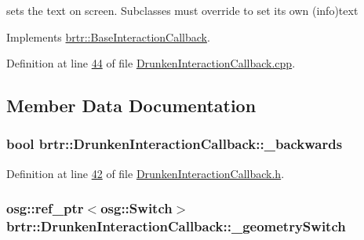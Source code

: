 sets the text on screen. Subclasses must override to set its own (info)text 



Implements \hyperlink{classbrtr_1_1_base_interaction_callback_a0fe57e329f044e21d49041c861435ad8}{brtr\+::\+Base\+Interaction\+Callback}.



Definition at line \hyperlink{_drunken_interaction_callback_8cpp_source_l00044}{44} of file \hyperlink{_drunken_interaction_callback_8cpp_source}{Drunken\+Interaction\+Callback.\+cpp}.



\subsection{Member Data Documentation}
\hypertarget{classbrtr_1_1_drunken_interaction_callback_a4be32ea919b41bd46acc34904fb5c7b7}{
\subsubsection[{\+\_\+backwards}]{\setlength{\rightskip}{0pt plus 5cm}bool brtr\+::\+Drunken\+Interaction\+Callback\+::\+\_\+backwards\hspace{0.3cm}{\ttfamily [private]}}}\label{classbrtr_1_1_drunken_interaction_callback_a4be32ea919b41bd46acc34904fb5c7b7}


Definition at line \hyperlink{_drunken_interaction_callback_8h_source_l00042}{42} of file \hyperlink{_drunken_interaction_callback_8h_source}{Drunken\+Interaction\+Callback.\+h}.

\hypertarget{classbrtr_1_1_drunken_interaction_callback_a0aa1983e0fc1cb720badb80464a8e391}{
\subsubsection[{\+\_\+geometry\+Switch}]{\setlength{\rightskip}{0pt plus 5cm}osg\+::ref\+\_\+ptr$<$osg\+::\+Switch$>$ brtr\+::\+Drunken\+Interaction\+Callback\+::\+\_\+geometry\+Switch\hspace{0.3cm}{\ttfamily [private]}}}\label{classbrtr_1_1_drunken_interaction_callback_a0aa1983e0fc1cb720badb80464a8e391}


